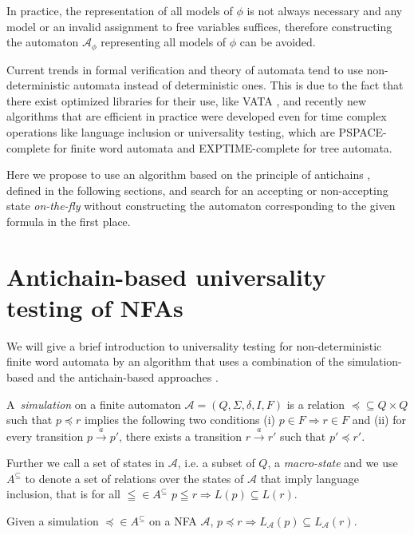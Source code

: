 In practice, the representation of all models of $\phi$ is not always necessary
and any model or an invalid assignment to free variables suffices, therefore
constructing the automaton $\mathcal{A}_{\phi}$ representing all models of
$\phi$ can be avoided.

Current trends in formal verification and theory of automata tend to use
non-deter\-ministic automata instead of deterministic ones. This is due to the
fact that there exist optimized libraries for their use, like VATA
\cite{vata}, and recently new algorithms that are efficient in practice
were developed even for time complex operations like language inclusion or
universality testing, which are PSPACE-complete for finite word automata and
EXPTIME-complete for tree automata.

Here we propose to use an algorithm based on the principle of antichains
\cite{tacas}, defined in the following sections, and search for an accepting
or non-accepting state \emph{on-the-fly} without constructing the automaton
corresponding to the given formula in the first place.

\section{Antichain-based universality testing of NFAs}

We will give a brief introduction to universality testing for non-deterministic
finite word automata by an algorithm that uses a combination
of the simulation-based and the antichain-based approaches \cite{tacas}.

\begin{defz}
A~\emph{simulation} on a finite automaton $\mathcal{A} = (Q, \Sigma, \delta, I,
F)$ is a relation $\preceq \subseteq Q \times Q$ such that $p \preceq r$ implies
the following two conditions (i) $p \in F \Rightarrow r \in F$ and (ii) for
every transition $p \overset{a}{\longrightarrow} p'$, there exists a transition $r
\overset{a}{\longrightarrow} r'$ such that $p' \preceq r'$.
\end{defz}

Further we call a set of states in $\mathcal{A}$, i.e. a subset of $Q$, a
\emph{macro-state} and we use $A^{\subseteq}$ to denote a set of relations over
the states of $\mathcal{A}$ that imply language inclusion, that is for all
$\leqq \in A^{\subseteq}$ $p \leqq r \Rightarrow L(p) \subseteq L(r)$.

\begin{lemma}
Given a simulation $\preceq \in A^{\subseteq}$ on a NFA $\mathcal{A}$, $p
\preceq r \Rightarrow L_\mathcal{A}(p) \subseteq L_\mathcal{A}(r)$.
\end{lemma}

